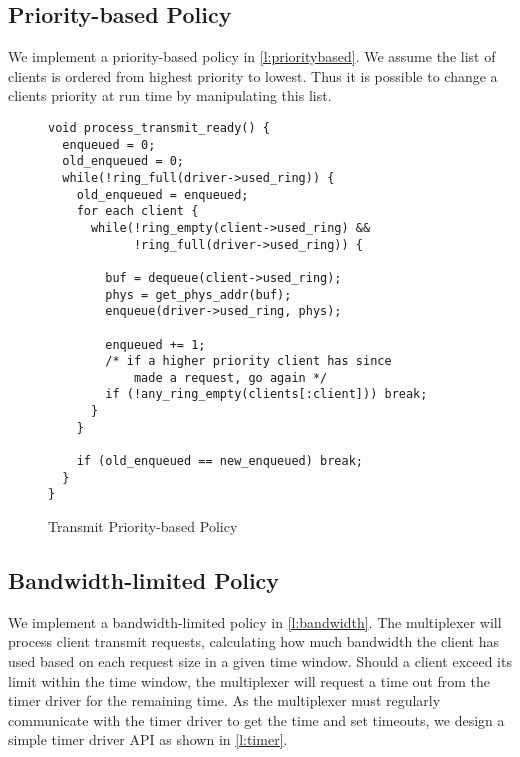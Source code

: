 \subsection{Priority-based Policy}

We implement a priority-based policy in \autoref{l:prioritybased}. We assume the list of
clients is ordered from highest priority to lowest. Thus it is possible to change a clients
priority at run time by manipulating this list.\\

\begin{figure} [H]
    \begin{verbatim}
void process_transmit_ready() {
  enqueued = 0;
  old_enqueued = 0;
  while(!ring_full(driver->used_ring)) {
    old_enqueued = enqueued;
    for each client {
      while(!ring_empty(client->used_ring) &&
            !ring_full(driver->used_ring)) {

        buf = dequeue(client->used_ring);
        phys = get_phys_addr(buf);
        enqueue(driver->used_ring, phys);

        enqueued += 1;
        /* if a higher priority client has since 
            made a request, go again */
        if (!any_ring_empty(clients[:client])) break;
      }
    }

    if (old_enqueued == new_enqueued) break;
  }
}
\end{verbatim}
\caption{Transmit Priority-based Policy}
\label{l:prioritybased}
\end{figure}

\subsection{Bandwidth-limited Policy}\label{s:bandwidth}

We implement a bandwidth-limited policy in \autoref{l:bandwidth}. The multiplexer will 
process client transmit requests, calculating how much bandwidth the client has used based on
each request size in a given time window. Should a client exceed its limit within the time window,
the multiplexer will request a time out from the timer driver for the remaining time. As the multiplexer must
regularly communicate with the timer driver to get the time and set timeouts, we design a simple timer driver
API as shown in \autoref{l:timer}. 

